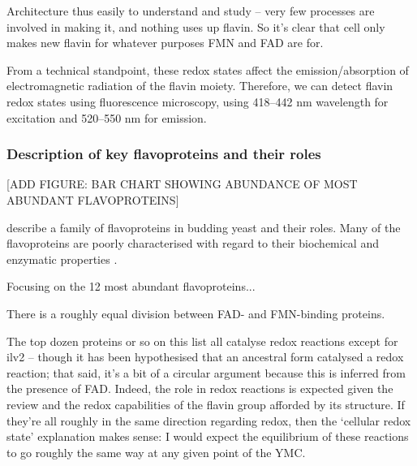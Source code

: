 Architecture thus easily to understand and study -- very few processes are involved in making it, and nothing uses up flavin.
So it's clear that cell only makes new flavin for whatever purposes FMN and FAD are for.

From a technical standpoint, these redox states affect the emission/absorption of electromagnetic radiation of the flavin moiety.
Therefore, we can detect flavin redox states using fluorescence microscopy, using 418--442 nm wavelength for excitation and 520--550 nm for emission.

\subsubsection{Description of key flavoproteins and their roles}
\label{subsubsec:intro-flavin-biochem-descriptions}

[ADD FIGURE: BAR CHART SHOWING ABUNDANCE OF MOST ABUNDANT FLAVOPROTEINS]

\citet{gudipatiFlavoproteomeYeastSaccharomyces2014} describe a family of flavoproteins in budding yeast and their roles. %
Many of the flavoproteins are poorly characterised with regard to their biochemical and enzymatic properties \citep{kochStructureBiochemicalKinetic2017}.

Focusing on the 12 most abundant \citep{hoUnificationProteinAbundance2018} flavoproteins...

There is a roughly equal division between FAD- and FMN-binding proteins.

The top dozen proteins or so on this list all catalyse redox reactions except for ilv2 -- though it has been hypothesised that an ancestral form catalysed a redox reaction; that said, it's a bit of a circular argument because this is inferred from the presence of FAD.
Indeed, the role in redox reactions is expected given the review and the redox capabilities of the flavin group afforded by its structure.
If they're all roughly in the same direction regarding redox, then the `cellular redox state' explanation makes sense: I would expect the equilibrium of these reactions to go roughly the same way at any given point of the YMC.

